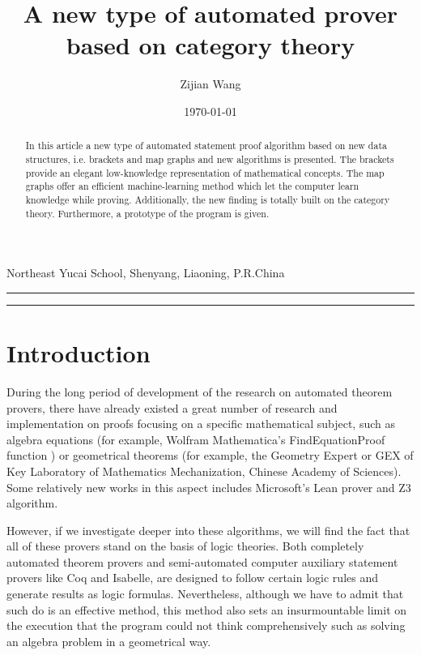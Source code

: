 \documentclass{article}
\numberwithin{theorem}{section}	%
\numberwithin{axiom}{section}	%
\numberwithin{definition}{section}	%
\begin{document}
\title{A new type of automated prover based on category theory}
\author{Zijian Wang}
\date{\today}	%
\maketitle

\begin{center}
Northeast Yucai School, Shenyang, Liaoning, P.R.China
\end{center}

\hrule %
\begin{abstract}
In this article a new type of automated statement proof algorithm based on new data structures, i.e. brackets and map graphs
and new algorithms is presented. The brackets provide an elegant low-knowledge representation of mathematical concepts. The map graphs offer an efficient machine-learning method which let the computer learn knowledge while proving. Additionally, the new finding is totally built on the category theory. Furthermore, a prototype of the program is given.
\end{abstract}
\hrule	%

\section{Introduction}
During the long period of development of the research on automated theorem provers, there have already existed a great number of research and implementation on proofs focusing on a specific mathematical subject, such as algebra equations (for example, Wolfram Mathematica{'}s FindEquationProof function \cite{2}) or geometrical theorems (for example, the Geometry Expert or GEX \cite{3} of Key Laboratory of Mathematics Mechanization, Chinese Academy of Sciences). Some relatively new works in this aspect includes Microsoft{'}s Lean prover \cite{8} and Z3 \cite{9} algorithm.

However, if we investigate deeper into these algorithms, we will find the fact that all of these provers stand on the basis of logic theories. Both completely automated theorem provers and semi-automated computer auxiliary statement provers like Coq and Isabelle, are designed to follow certain logic rules and generate results as logic formulas. Nevertheless, although we have to admit that such do is an effective method, this method also sets an insurmountable limit on the execution that the program could not think comprehensively such as solving an algebra problem in a geometrical way.
\end{document}
